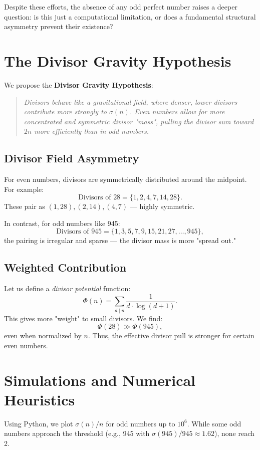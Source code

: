 \documentclass[12pt]{article}
\begin{document}
Despite these efforts, the absence of any odd perfect number raises a deeper question: is this just a computational limitation, or does a fundamental structural asymmetry prevent their existence?

\section{The Divisor Gravity Hypothesis}
We propose the \textbf{Divisor Gravity Hypothesis}:
\begin{quote}
    \emph{Divisors behave like a gravitational field, where denser, lower divisors contribute more strongly to $\sigma(n)$. Even numbers allow for more concentrated and symmetric divisor "mass", pulling the divisor sum toward $2n$ more efficiently than in odd numbers.}
\end{quote}

\subsection{Divisor Field Asymmetry}
For even numbers, divisors are symmetrically distributed around the midpoint. For example:
\begin{equation*}
\text{Divisors of } 28 = \{1, 2, 4, 7, 14, 28\}.
\end{equation*}
These pair as $(1,28), (2,14), (4,7)$ — highly symmetric.

In contrast, for odd numbers like 945:
\begin{equation*}
\text{Divisors of } 945 = \{1, 3, 5, 7, 9, 15, 21, 27, \dots, 945\},
\end{equation*}
the pairing is irregular and sparse — the divisor mass is more "spread out."

\subsection{Weighted Contribution}
Let us define a \emph{divisor potential} function:
\begin{equation}
\Phi(n) = \sum_{d \mid n} \frac{1}{d \cdot \log(d+1)}.
\end{equation}
This gives more "weight" to small divisors. We find:
\begin{equation*}
\Phi(28) \gg \Phi(945),
\end{equation*}
even when normalized by $n$. Thus, the effective divisor pull is stronger for certain even numbers.

\section{Simulations and Numerical Heuristics}
Using Python, we plot $\sigma(n)/n$ for odd numbers up to $10^6$. While some odd numbers approach the threshold (e.g., 945 with $\sigma(945)/945 \approx 1.62$), none reach 2.
\end{document}
